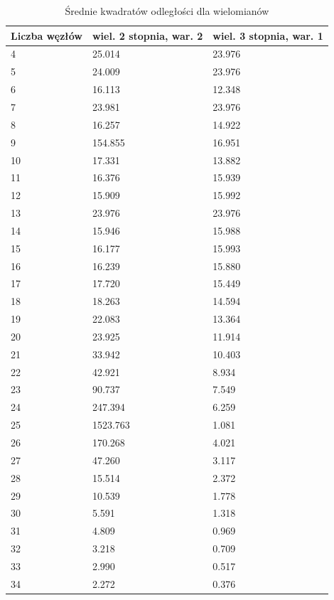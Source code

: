 \documentclass{article}
\begin{document}
\newpage
\begin{table}[H]
\centering
\begin{tabular}{|l|l|l|}
\hline
Liczba węzłów & wiel. 2 stopnia, war. 2 & wiel. 3 stopnia, war. 1\\ \hline
4 & 25.014    & 23.976     \\ \hline
5 & 24.009      & 23.976    \\ \hline
6 & 16.113    & 12.348    \\ \hline
7 & 23.981    & 23.976    \\ \hline
8 & 16.257    & 14.922    \\ \hline
9  & 154.855      & 16.951    \\ \hline
10 & 17.331      & 13.882    \\ \hline
11 & 16.376     & 15.939     \\ \hline
12 & 15.909     & 15.992     \\ \hline
13 & 23.976     & 23.976    \\ \hline
14 & 15.946     & 15.988    \\ \hline
15 & 16.177     & 15.993    \\ \hline
16 & 16.239     & 15.880    \\ \hline
17 & 17.720     & 15.449     \\ \hline
18 & 18.263     & 14.594    \\ \hline
19 & 22.083      & 13.364   \\ \hline
20 & 23.925      & 11.914    \\ \hline
21 & 33.942      & 10.403    \\ \hline
22 & 42.921      & 8.934     \\ \hline
23 & 90.737      & 7.549    \\ \hline
24  & 247.394      & 6.259    \\ \hline
25   & 1523.763    & 1.081    \\ \hline
26  & 170.268      & 4.021    \\ \hline
27 & 47.260      & 3.117    \\ \hline
28 & 15.514     & 2.372    \\ \hline
29 & 10.539     & 1.778     \\ \hline
30& 5.591     & 1.318    \\ \hline
31& 4.809     &   0.969   \\ \hline
32& 3.218     &  0.709   \\ \hline
33& 2.990     & 0.517   \\ \hline
34& 2.272     &  0.376   \\ \hline
\end{tabular}
\caption{Średnie kwadratów odległości dla wielomianów}
\end{table}
\end{document}

